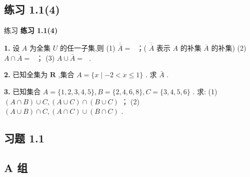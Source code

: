 \documentclass[a4paper,10pt,oneside,fontset=none]{ctexbook}
\renewcommand{\leq}{\leqslant}
\newcommand{\fillin}[1][2cm]{\,\underline{\hspace{#1}}\,}
\newenvironment{exercise}[1][]{\begin{exBox}{练习}{#1}}{\end{exBox}}
\numberwithin{equation}{chapter}
\begin{document}
\subsection*{练习 1.1(4)}

\begin{exercise}
\textbf{练习 1.1(4)}\par\vspace{0.5em}
\textbf{1.} 设 $A$ 为全集 $U$ 的任一子集,则 (1) $\overline{\overline{A}} =$ \fillin[2cm]；( $\overline{\overline{A}}$ 表示 $A$ 的补集 $\overline{A}$ 的补集) (2) $A \cap  \overline{A} =$ \fillin[2cm]； (3) $A \cup  \bar{A} =$ \fillin[2cm].
\par\vspace{0.8em}
\textbf{2.} 已知全集为 $\mathbf{R}$ ,集合 $A = \{ x \mid   - 2 < x \leq  1\}$ . 求 $\bar{A}$ .
\par\vspace{0.8em}
\textbf{3.} 已知集合 $A = \{ 1,2,3,4,5\} , B = \{ 2,4,6,8\} , C = \{ 3,4,5,6\}$ . 求: (1) $\left( {A \cap  B}\right)  \cup  C,\left( {A \cup  C}\right)  \cap  \left( {B \cup  C}\right)$ ； (2) $\left( {A \cup  B}\right)  \cap  C,\left( {A \cap  C}\right)  \cup  \left( {B \cap  C}\right)$ .
\end{exercise}

\subsection*{习题 1.1}

\subsection*{A 组}
\end{document}
